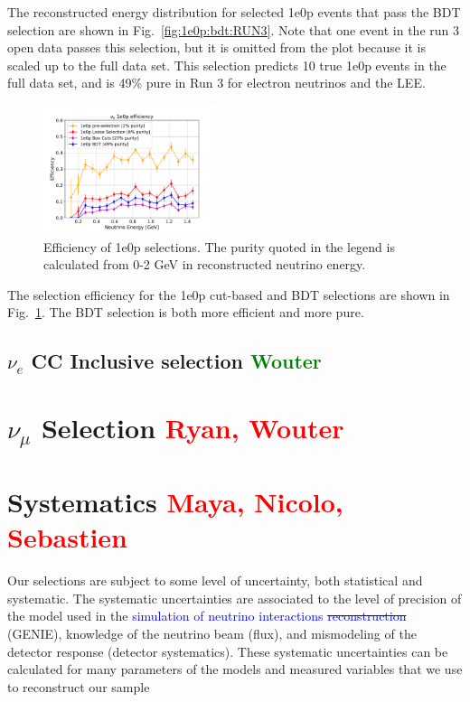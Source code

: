 \documentclass[a4paper]{article}
\begin{document}
The reconstructed energy distribution for selected 1e0p events that pass the BDT selection are shown in Fig.~\ref{fig:1e0p:bdt:RUN3}.  Note that one event in the run 3 open data passes this selection, but it is omitted from the plot because it is scaled up to the full data set.  This selection predicts 10 true 1e0p events in the full data set, and is 49\% pure in Run 3 for electron neutrinos and the LEE.

\begin{figure}[H]
\begin{center}
\includegraphics[width=0.45\textwidth]{1e0p/efficiency_RUN3.pdf}
\caption{\label{fig:1e0p:eff:RUN3} Efficiency of 1e0p selections.  The purity quoted in the legend is calculated from 0-2 GeV in reconstructed neutrino energy.}
\end{center}
\end{figure}

The selection efficiency for the 1e0p cut-based and BDT selections are shown in Fig.~\ref{fig:1e0p:eff:RUN3}.  The BDT selection is both more efficient and more pure. 

\clearpage

\subsection{$\nu_e$ CC Inclusive selection \textcolor{green}{Wouter}}

\clearpage

\section{$\nu_{\mu}$ Selection \textcolor{red}{Ryan, Wouter}}
\label{sec:numuselection}

\clearpage

\section{Systematics \textcolor{red}{Maya, Nicolo, Sebastien}}
\label{sec:systematics}

Our selections are subject to some level of uncertainty, both statistical and systematic. The systematic uncertainties are associated to the level of precision of the model used in the \textcolor{blue}{simulation of neutrino interactions \st{reconstruction}} (GENIE), knowledge of the neutrino beam (flux), and mismodeling of the detector response (detector systematics). These systematic uncertainties can be calculated for many parameters of the models and measured variables that we use to reconstruct our sample
\end{document}
